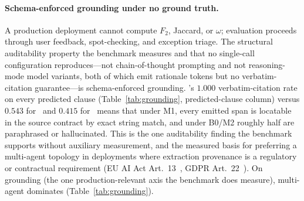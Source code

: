 \paragraph{Schema-enforced grounding under no ground truth.}
A production deployment cannot compute $F_2$, Jaccard, or $\omega$;
evaluation proceeds through user feedback, spot-checking, and exception
triage. The structural auditability property the benchmark measures and
that no single-call configuration reproduces---not chain-of-thought
prompting and not reasoning-mode model variants, both of which emit
rationale tokens but no verbatim-citation guarantee---is schema-enforced
grounding. \cfgMA's $1.000$ verbatim-citation rate on every predicted clause
(Table~\ref{tab:grounding}, predicted-clause column) versus $0.543$ for
\cfgZS\ and $0.415$ for \cfgCP\ means that under M1, every emitted span is
locatable in the source contract by exact string match, and under B0/M2
roughly half are paraphrased or hallucinated. This is the one auditability
finding the benchmark supports without auxiliary measurement, and the
measured basis for preferring a multi-agent topology in deployments where
extraction provenance is a regulatory or contractual requirement
(EU AI Act Art.~13~\cite{euaiact2024}, GDPR Art.~22~\cite{gdpr2016}).
On grounding (the one production-relevant axis the benchmark does measure),
multi-agent dominates (Table~\ref{tab:grounding}).

